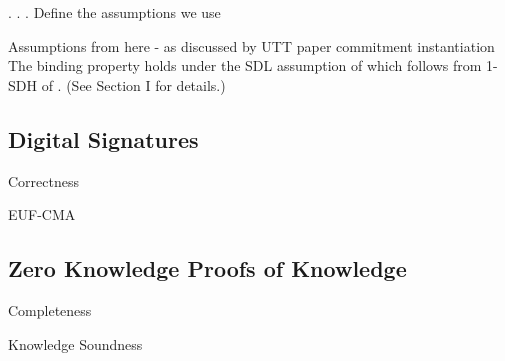 \begin{definition}
    
\end{definition}


\begin{definition}
    
\end{definition}


\begin{definition}
    
\end{definition}

.
.
.
Define the assumptions we use

\begin{definition}[q-sdh]
    
\end{definition}

Assumptions from here - as discussed by UTT paper commitment instantiation
The binding property holds under the SDL assumption of \cite{hutchison_get_2010}
which follows from 1-SDH of \cite{boneh_short_2008}. (See Section I for details.) 





\subsection{Digital Signatures}

\begin{definition}[Correctness]
    Correctness
\end{definition}



\begin{definition}
    EUF-CMA
\end{definition}







\subsection{Zero Knowledge Proofs of Knowledge}



\begin{definition}[Completeness]
   Completeness
\end{definition}


\begin{definition}
    Knowledge Soundness
\end{definition}


